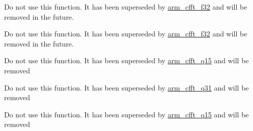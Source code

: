 
\begin{DoxyRefList}
\item[\label{deprecated__deprecated000001}%
\hypertarget{deprecated__deprecated000001}{}%
Member \hyperlink{group__ComplexFFT_ga9fadd650b802f612ae558ddaab789a6d}{arm\+\_\+cfft\+\_\+radix2\+\_\+f32} (const arm\+\_\+cfft\+\_\+radix2\+\_\+instance\+\_\+f32 $\ast$S, float32\+\_\+t $\ast$p\+Src)]Do not use this function. It has been superseded by \hyperlink{group__ComplexFFT_gade0f9c4ff157b6b9c72a1eafd86ebf80}{arm\+\_\+cfft\+\_\+f32} and will be removed in the future.  
\item[\label{deprecated__deprecated000002}%
\hypertarget{deprecated__deprecated000002}{}%
Member \hyperlink{group__ComplexFFT_gac9565e6bc7229577ecf5e090313cafd7}{arm\+\_\+cfft\+\_\+radix2\+\_\+init\+\_\+f32} (arm\+\_\+cfft\+\_\+radix2\+\_\+instance\+\_\+f32 $\ast$S, uint16\+\_\+t fft\+Len, uint8\+\_\+t ifft\+Flag, uint8\+\_\+t bit\+Reverse\+Flag)]Do not use this function. It has been superseded by \hyperlink{group__ComplexFFT_gade0f9c4ff157b6b9c72a1eafd86ebf80}{arm\+\_\+cfft\+\_\+f32} and will be removed in the future.  
\item[\label{deprecated__deprecated000003}%
\hypertarget{deprecated__deprecated000003}{}%
Member \hyperlink{group__ComplexFFT_ga5c5b2127b3c4ea2d03692127f8543858}{arm\+\_\+cfft\+\_\+radix2\+\_\+init\+\_\+q15} (arm\+\_\+cfft\+\_\+radix2\+\_\+instance\+\_\+q15 $\ast$S, uint16\+\_\+t fft\+Len, uint8\+\_\+t ifft\+Flag, uint8\+\_\+t bit\+Reverse\+Flag)]Do not use this function. It has been superseded by \hyperlink{group__ComplexFFT_ga68cdacd2267a2967955e40e6b7ec1229}{arm\+\_\+cfft\+\_\+q15} and will be removed  
\item[\label{deprecated__deprecated000004}%
\hypertarget{deprecated__deprecated000004}{}%
Member \hyperlink{group__ComplexFFT_gabec9611e77382f31e152668bf6b4b638}{arm\+\_\+cfft\+\_\+radix2\+\_\+init\+\_\+q31} (arm\+\_\+cfft\+\_\+radix2\+\_\+instance\+\_\+q31 $\ast$S, uint16\+\_\+t fft\+Len, uint8\+\_\+t ifft\+Flag, uint8\+\_\+t bit\+Reverse\+Flag)]Do not use this function. It has been superseded by \hyperlink{group__ComplexFFT_ga5a0008bd997ab6e2e299ef2fb272fb4b}{arm\+\_\+cfft\+\_\+q31} and will be removed  
\item[\label{deprecated__deprecated000005}%
\hypertarget{deprecated__deprecated000005}{}%
Member \hyperlink{group__ComplexFFT_ga55b424341dc3efd3fa0bcaaff4bdbf40}{arm\+\_\+cfft\+\_\+radix2\+\_\+q15} (const arm\+\_\+cfft\+\_\+radix2\+\_\+instance\+\_\+q15 $\ast$S, q15\+\_\+t $\ast$p\+Src)]Do not use this function. It has been superseded by \hyperlink{group__ComplexFFT_ga68cdacd2267a2967955e40e6b7ec1229}{arm\+\_\+cfft\+\_\+q15} and will be removed  

\end{DoxyRefList}
